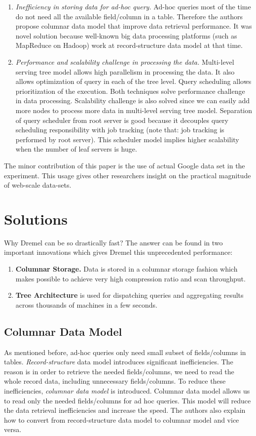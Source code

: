 \documentclass[twocolumn]{article}
\newcommand{\be}{\begin{enumerate}}
\newcommand{\ee}{\end{enumerate}}
\newcommand{\ii}{\item}
\begin{document}
\be
\ii \textit{Inefficiency in storing data for ad-hoc query.}
Ad-hoc queries most of the time do not need all the available field/column in a table. Therefore the authors propose columnar data model that improve data retrieval performance. It was novel solution because well-known big data processing platforms (such as MapReduce on Hadoop) work at record-structure data model at that time.
\ii \textit{Performance and scalability challenge in processing the data.}
Multi-level serving tree model allows high parallelism in processing the data. It also allows optimization of query in each of the tree level. Query scheduling allows prioritization of the execution. Both techniques solve performance challenge in data processing.
Scalability challenge is also solved since we can easily add more nodes to process more data in multi-level serving tree model. Separation of query scheduler from root server is good because it decouples query scheduling responsibility with job tracking (note that: job tracking is performed by root server). This scheduler model implies higher scalability when the number of leaf servers is huge.
\ee
The minor contribution of this paper is the use of actual Google data set in the experiment. 
This usage gives other researchers insight on the practical magnitude of web-scale data-sets.

\section{Solutions}
Why Dremel can be so drastically fast? 
The answer can be found in two important innovations which gives Dremel this unprecedented performance:
\be
\ii \textbf{Columnar Storage.} Data is stored in a columnar storage fashion which makes possible to achieve very high compression ratio and scan throughput.
\ii \textbf{Tree Architecture} is used for dispatching queries and aggregating results across thousands of machines in a few seconds.
\ee

\subsection{Columnar Data Model}
As mentioned before, ad-hoc queries only need small subset of fields/columns in tables. \textit{Record-structure} data model introduces significant inefficiencies. The reason is in order to retrieve the needed fields/columns, we need to read the whole record data, including unnecessary fields/columns. To reduce these inefficiencies, \textit{columnar data model} is introduced. Columnar data model allows us to read only the needed fields/columns for ad hoc queries. This model will reduce the data retrieval inefficiencies and increase the speed. The authors also explain how to convert from record-structure data model to columnar model and vice versa.
\end{document}
